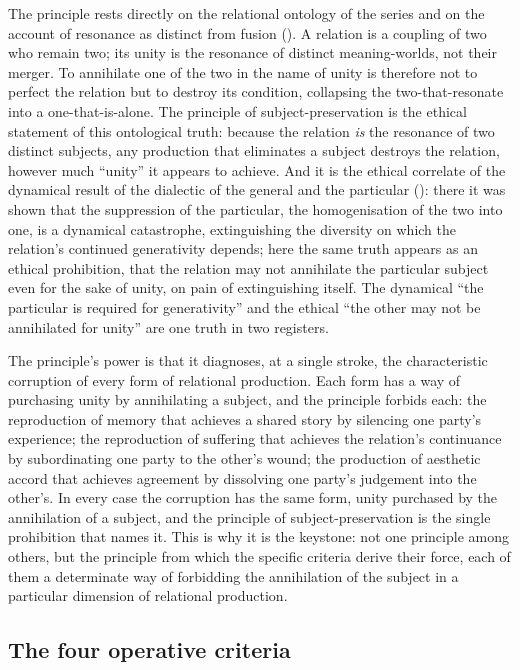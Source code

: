 \noindent
The principle rests directly on the relational ontology of the series \parencite{wan2024grb} and on the account of resonance as distinct from fusion (). A relation is a coupling of two who remain two; its unity is the resonance of distinct meaning-worlds, not their merger. To annihilate one of the two in the name of unity is therefore not to perfect the relation but to destroy its condition, collapsing the two-that-resonate into a one-that-is-alone. The principle of subject-preservation is the ethical statement of this ontological truth: because the relation \emph{is} the resonance of two distinct subjects, any production that eliminates a subject destroys the relation, however much ``unity'' it appears to achieve. And it is the ethical correlate of the dynamical result of the dialectic of the general and the particular (): there it was shown that the suppression of the particular, the homogenisation of the two into one, is a dynamical catastrophe, extinguishing the diversity on which the relation's continued generativity depends; here the same truth appears as an ethical prohibition, that the relation may not annihilate the particular subject even for the sake of unity, on pain of extinguishing itself. The dynamical ``the particular is required for generativity'' and the ethical ``the other may not be annihilated for unity'' are one truth in two registers.

The principle's power is that it diagnoses, at a single stroke, the characteristic corruption of every form of relational production. Each form has a way of purchasing unity by annihilating a subject, and the principle forbids each: the reproduction of memory that achieves a shared story by silencing one party's experience; the reproduction of suffering that achieves the relation's continuance by subordinating one party to the other's wound; the production of aesthetic accord that achieves agreement by dissolving one party's judgement into the other's. In every case the corruption has the same form, unity purchased by the annihilation of a subject, and the principle of subject-preservation is the single prohibition that names it. This is why it is the keystone: not one principle among others, but the principle from which the specific criteria derive their force, each of them a determinate way of forbidding the annihilation of the subject in a particular dimension of relational production.

\subsection{The four operative criteria}
\label{p21:sub:rp-criteria}


